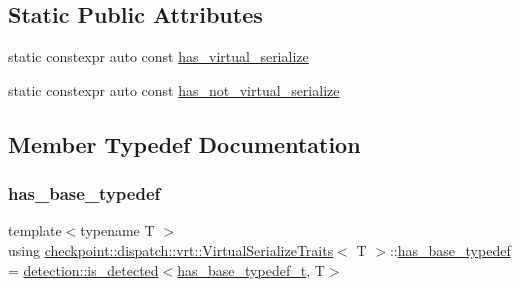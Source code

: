 \subsection*{Static Public Attributes}
\begin{DoxyCompactItemize}
\item 
static constexpr auto const \hyperlink{structcheckpoint_1_1dispatch_1_1vrt_1_1_virtual_serialize_traits_a21d83fdae98269101791620d64160887}{has\+\_\+virtual\+\_\+serialize}
\item 
static constexpr auto const \hyperlink{structcheckpoint_1_1dispatch_1_1vrt_1_1_virtual_serialize_traits_a97ce9c5581f6ff66cbc91d5ca5750e2f}{has\+\_\+not\+\_\+virtual\+\_\+serialize}
\end{DoxyCompactItemize}


\subsection{Member Typedef Documentation}
\mbox{\label{structcheckpoint_1_1dispatch_1_1vrt_1_1_virtual_serialize_traits_a5ef65f047ffa20ed206485238ceb2af5}} 
\subsubsection{\texorpdfstring{has\+\_\+base\+\_\+typedef}{has\_base\_typedef}}
{\footnotesize\ttfamily template$<$typename T $>$ \\
using \hyperlink{structcheckpoint_1_1dispatch_1_1vrt_1_1_virtual_serialize_traits}{checkpoint\+::dispatch\+::vrt\+::\+Virtual\+Serialize\+Traits}$<$ T $>$\+::\hyperlink{structcheckpoint_1_1dispatch_1_1vrt_1_1_virtual_serialize_traits_a5ef65f047ffa20ed206485238ceb2af5}{has\+\_\+base\+\_\+typedef} =  \hyperlink{namespacedetection_a30893549a3de1e9603d78dad6d5dce92}{detection\+::is\+\_\+detected}$<$\hyperlink{structcheckpoint_1_1dispatch_1_1vrt_1_1_virtual_serialize_traits_a900e9fcb655c36ab48fd6db0f0258b75}{has\+\_\+base\+\_\+typedef\+\_\+t}, T$>$}

\mbox{\label{structcheckpoint_1_1dispatch_1_1vrt_1_1_virtual_serialize_traits_a900e9fcb655c36ab48fd6db0f0258b75}} 
